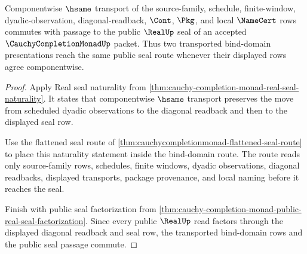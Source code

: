 \begin{theorem}
\label{thm:cauchy-completion-monad-real-seal-functoriality}
Componentwise $\hsame$ transport of the source-family, schedule, finite-window, dyadic-observation, diagonal-readback, $\Cont$, $\Pkg$, and local $\NameCert$ rows commutes with passage to the public $\RealUp$ seal of an accepted $\CauchyCompletionMonadUp$ packet. Thus two transported bind-domain presentations reach the same public seal route whenever their displayed rows agree componentwise.
\end{theorem}
\begin{proof}
Apply Real seal naturality from \autoref{thm:cauchy-completion-monad-real-seal-naturality}. It states that componentwise $\hsame$ transport preserves the move from scheduled dyadic observations to the diagonal readback and then to the displayed seal row.

Use the flattened seal route of \autoref{thm:cauchycompletionmonad-flattened-seal-route} to place this naturality statement inside the bind-domain route. The route reads only source-family rows, schedules, finite windows, dyadic observations, diagonal readbacks, displayed transports, package provenance, and local naming before it reaches the seal.

Finish with public seal factorization from \autoref{thm:cauchy-completion-monad-public-real-seal-factorization}. Since every public $\RealUp$ read factors through the displayed diagonal readback and seal row, the transported bind-domain rows and the public seal passage commute.
\end{proof}

